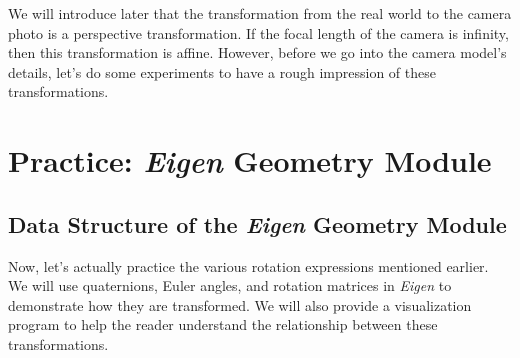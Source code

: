 We will introduce later that the transformation from the real world to the camera photo is a perspective transformation. If the focal length of the camera is infinity, then this transformation is affine. However, before we go into the camera model's details, let's do some experiments to have a rough impression of these transformations.

\section{Practice: \textit{Eigen} Geometry Module}
\subsection{Data Structure of the \textit{Eigen} Geometry Module}

Now, let's actually practice the various rotation expressions mentioned earlier. We will use quaternions, Euler angles, and rotation matrices in \textit{Eigen} to demonstrate how they are transformed. We will also provide a visualization program to help the reader understand the relationship between these transformations.

